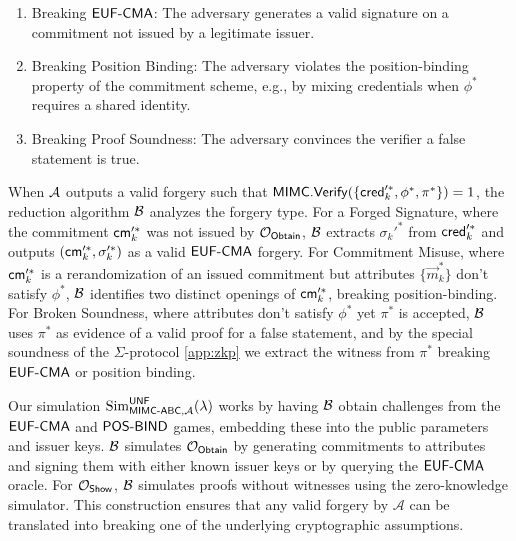 \begin{enumerate} 
\item Breaking $\mathsf{EUF\text{-}CMA}$: The adversary generates a valid signature on a commitment not issued by a legitimate issuer. 
\item Breaking Position Binding: The adversary violates the position-binding property of the commitment scheme, e.g., by mixing credentials when $\phi^*$ requires a shared identity. 
\item Breaking Proof Soundness: The adversary convinces the verifier a false statement is true. 
\end{enumerate}

When $\mathcal{A}$ outputs a valid forgery such that $\mathsf{MIMC.Verify}(\{\mathsf{cred}_k'^*, \phi^*, \pi^*\})=1$, the reduction algorithm $\mathcal{B}$ analyzes the forgery type. For a Forged Signature, where the commitment $\mathsf{cm}_k'^*$ was not issued by $\mathcal{O}_{\mathsf{Obtain}}$, $\mathcal{B}$ extracts $\sigma_k'^*$ from $\mathsf{cred}_k'^*$ and outputs $(\mathsf{cm}_k'^*, \sigma_k'^*)$ as a valid $\mathsf{EUF\text{-}CMA}$ forgery. For Commitment Misuse, where $\mathsf{cm}_k'^*$ is a rerandomization of an issued commitment but attributes $\{\vec{m}_k^*\}$ don't satisfy $\phi^*$, $\mathcal{B}$ identifies two distinct openings of $\mathsf{cm}_k'^*$, breaking position-binding. For Broken Soundness, where attributes don't satisfy $\phi^*$ yet $\pi^*$ is accepted, $\mathcal{B}$ uses $\pi^*$ as evidence of a valid proof for a false statement, and by the special soundness of the $\Sigma$-protocol \ref{app:zkp} we extract the witness from $\pi^*$ breaking $\mathsf{EUF\text{-}CMA}$ or position binding.


Our simulation $\mathrm{Sim}^{\mathsf{UNF}}_{\mathsf{MIMC\text{-}ABC}, \mathcal{A}}(\lambda)$ works by having $\mathcal{B}$ obtain challenges from the $\mathsf{EUF\text{-}CMA}$ and $\mathsf{POS\text{-}BIND}$ games, embedding these into the public parameters and issuer keys. $\mathcal{B}$ simulates $\mathcal{O}_{\mathsf{Obtain}}$ by generating commitments to attributes and signing them with either known issuer keys or by querying the $\mathsf{EUF\text{-}CMA}$ oracle. For $\mathcal{O}_{\mathsf{Show}}$, $\mathcal{B}$ simulates proofs without witnesses using the zero-knowledge simulator. This construction ensures that any valid forgery by $\mathcal{A}$ can be translated into breaking one of the underlying cryptographic assumptions.


